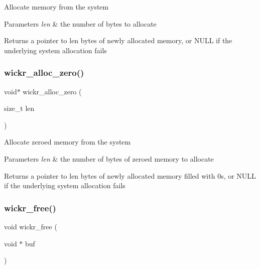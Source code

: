 Allocate memory from the system


\begin{DoxyParams}{Parameters}
{\em len} & the number of bytes to allocate \\
\hline
\end{DoxyParams}
\begin{DoxyReturn}{Returns}
a pointer to \textquotesingle{}len\textquotesingle{} bytes of newly allocated memory, or N\+U\+LL if the underlying system allocation fails 
\end{DoxyReturn}
\mbox{\label{group__memory__functions_ga8163f2ae01a21e319806fbba9b9da00a}} 
\subsubsection{\texorpdfstring{wickr\+\_\+alloc\+\_\+zero()}{wickr\_alloc\_zero()}}
{\footnotesize\ttfamily void$\ast$ wickr\+\_\+alloc\+\_\+zero (\begin{DoxyParamCaption}\item[{size\+\_\+t}]{len }\end{DoxyParamCaption})}

Allocate zeroed memory from the system


\begin{DoxyParams}{Parameters}
{\em len} & the number of bytes of zeroed memory to allocate \\
\hline
\end{DoxyParams}
\begin{DoxyReturn}{Returns}
a pointer to \textquotesingle{}len\textquotesingle{} bytes of newly allocated memory filled with 0s, or N\+U\+LL if the underlying system allocation fails 
\end{DoxyReturn}
\mbox{\label{group__memory__functions_ga0ec3692f8dc5c2df128743c515d300c1}} 
\subsubsection{\texorpdfstring{wickr\+\_\+free()}{wickr\_free()}}
{\footnotesize\ttfamily void wickr\+\_\+free (\begin{DoxyParamCaption}\item[{void $\ast$}]{buf }\end{DoxyParamCaption})}

